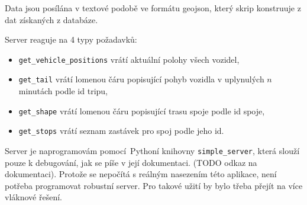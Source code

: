 \bigbreak

Data jsou posílána v textové podobě ve formátu \gls{geojson}, který skrip konstruuje z dat získaných z databáze.

\bigbreak

Server reaguje na 4 typy požadavků:

\begin{itemize}
	\item \verb-get_vehicle_positions- vrátí aktuální polohy všech vozidel,

	\item \verb-get_tail- vrátí lomenou čáru popisující pohyb vozidla v uplynulých $n$ minutách podle id tripu,

	\item \verb-get_shape- vrátí lomenou čáru popisující trasu spoje podle id spoje,

	\item \verb-get_stops- vrátí seznam zastávek pro spoj podle jeho id.
\end{itemize}

\bigbreak

Server je naprogramovám pomocí Pythoní knihovny \verb-simple_server-, která slouží pouze k debugování, jak se píše v její dokumentaci. (TODO odkaz na dokumentaci). Protože se nepočítá s reálným nasezením této aplikace, není potřeba programovat robustní server. Pro takové užití by bylo třeba přejít na více vláknové řešení.
























